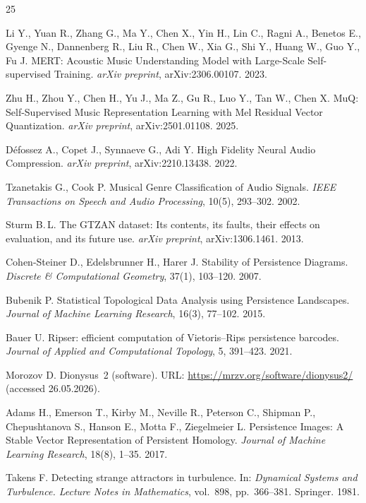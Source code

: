 \begin{thebibliography}{25}

Li Y., Yuan R., Zhang G., Ma Y., Chen X., Yin H., Lin C., Ragni A., Benetos E., Gyenge N., Dannenberg R., Liu R., Chen W., Xia G., Shi Y., Huang W., Guo Y., Fu J.
MERT: Acoustic Music Understanding Model with Large-Scale Self-supervised Training.
\textit{arXiv preprint}, arXiv:2306.00107. 2023.

Zhu H., Zhou Y., Chen H., Yu J., Ma Z., Gu R., Luo Y., Tan W., Chen X.
MuQ: Self-Supervised Music Representation Learning with Mel Residual Vector Quantization.
\textit{arXiv preprint}, arXiv:2501.01108. 2025.

D\'{e}fossez A., Copet J., Synnaeve G., Adi Y.
High Fidelity Neural Audio Compression.
\textit{arXiv preprint}, arXiv:2210.13438. 2022.

Tzanetakis G., Cook P.
Musical Genre Classification of Audio Signals.
\textit{IEEE Transactions on Speech and Audio Processing}, 10(5), 293--302. 2002.

Sturm B.\,L.
The GTZAN dataset: Its contents, its faults, their effects on evaluation, and its future use.
\textit{arXiv preprint}, arXiv:1306.1461. 2013.

Cohen-Steiner D., Edelsbrunner H., Harer J.
Stability of Persistence Diagrams.
\textit{Discrete \& Computational Geometry}, 37(1), 103--120. 2007.

Bubenik P.
Statistical Topological Data Analysis using Persistence Landscapes.
\textit{Journal of Machine Learning Research}, 16(3), 77--102. 2015.

Bauer U.
Ripser: efficient computation of Vietoris--Rips persistence barcodes.
\textit{Journal of Applied and Computational Topology}, 5, 391--423. 2021.

Morozov D.
Dionysus~2 (software).
URL: \url{https://mrzv.org/software/dionysus2/} (accessed 26.05.2026).

Adams H., Emerson T., Kirby M., Neville R., Peterson C., Shipman P., Chepushtanova S., Hanson E., Motta F., Ziegelmeier L.
Persistence Images: A Stable Vector Representation of Persistent Homology.
\textit{Journal of Machine Learning Research}, 18(8), 1--35. 2017.

Takens F.
Detecting strange attractors in turbulence.
In: \textit{Dynamical Systems and Turbulence. Lecture Notes in Mathematics}, vol.~898, pp.~366--381. Springer. 1981.


\end{thebibliography}
